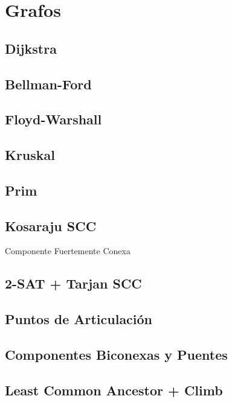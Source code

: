 \newpage
\section{Grafos}
\subsection{Dijkstra}

\subsection{Bellman-Ford}

\subsection{Floyd-Warshall}

\subsection{Kruskal}

\subsection{Prim}

\subsection{Kosaraju SCC}
Componente Fuertemente Conexa

\subsection{2-SAT + Tarjan SCC}

\subsection{Puntos de Articulaci\'on}

\subsection{Componentes Biconexas y Puentes}

\subsection{Least Common Ancestor + Climb}


